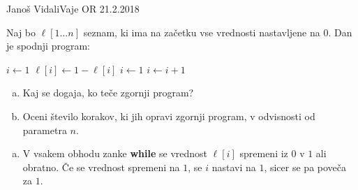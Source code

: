 \begin{naloga}{Janoš Vidali}{Vaje OR 21.2.2018}
\begin{vprasanje}[stevec]
Naj bo $\ell[1 \dots n]$ seznam,
ki ima na začetku vse vrednosti nastavljene na $0$.
Dan je spodnji program:

\begin{small}
\begin{algorithmic}
\State $i \gets 1$
    \State $\ell[i] \gets 1 - \ell[i]$
        \State $i \gets 1$
    \Else
        \State $i \gets i+1$
    \EndIf
\EndWhile
\end{algorithmic}
\end{small}

\begin{enumerate}[(a)]
\item Kaj se dogaja, ko teče zgornji program?
\item Oceni število korakov, ki jih opravi zgornji program,
v odvisnosti od parametra $n$.
\end{enumerate}
\end{vprasanje}

\begin{odgovor}
\begin{enumerate}[(a)]
\item V vsakem obhodu zanke {\bf while}
se vrednost $\ell[i]$ spremeni iz $0$ v $1$ ali obratno.
Če se vrednost spremeni na $1$, se $i$ nastavi na $1$,
sicer se pa poveča za $1$.


\end{enumerate}
\end{odgovor}
\end{naloga}
